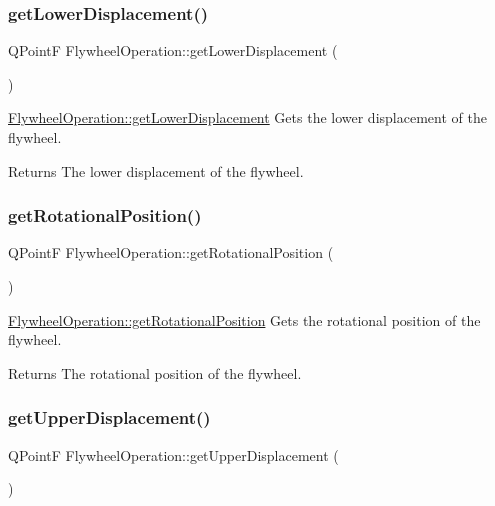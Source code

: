 \subsubsection{\texorpdfstring{get\+Lower\+Displacement()}{getLowerDisplacement()}}
{\footnotesize\ttfamily Q\+PointF Flywheel\+Operation\+::get\+Lower\+Displacement (\begin{DoxyParamCaption}{ }\end{DoxyParamCaption})}



\hyperlink{class_flywheel_operation_a2b9d24d0fbbf1d9cb79bb0aa54f6f6ae}{Flywheel\+Operation\+::get\+Lower\+Displacement} Gets the lower displacement of the flywheel. 

\begin{DoxyReturn}{Returns}
The lower displacement of the flywheel. 
\end{DoxyReturn}
\hypertarget{class_flywheel_operation_a0e1ba213763760cf0128dfdc8436cfdf}{}\label{class_flywheel_operation_a0e1ba213763760cf0128dfdc8436cfdf} 
\subsubsection{\texorpdfstring{get\+Rotational\+Position()}{getRotationalPosition()}}
{\footnotesize\ttfamily Q\+PointF Flywheel\+Operation\+::get\+Rotational\+Position (\begin{DoxyParamCaption}{ }\end{DoxyParamCaption})}



\hyperlink{class_flywheel_operation_a0e1ba213763760cf0128dfdc8436cfdf}{Flywheel\+Operation\+::get\+Rotational\+Position} Gets the rotational position of the flywheel. 

\begin{DoxyReturn}{Returns}
The rotational position of the flywheel. 
\end{DoxyReturn}
\hypertarget{class_flywheel_operation_a16ebc2fe8c3297350eaf9be2114a75c8}{}\label{class_flywheel_operation_a16ebc2fe8c3297350eaf9be2114a75c8} 
\subsubsection{\texorpdfstring{get\+Upper\+Displacement()}{getUpperDisplacement()}}
{\footnotesize\ttfamily Q\+PointF Flywheel\+Operation\+::get\+Upper\+Displacement (\begin{DoxyParamCaption}{ }\end{DoxyParamCaption})}



